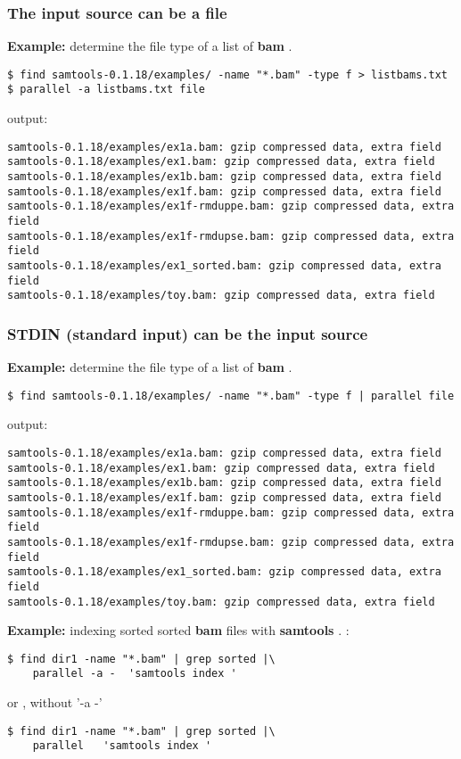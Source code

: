 \documentclass{article}
\newcommand{\example}[1]{
\textbf{Example: } {\color[rgb]{0,0,1} #1 } .
}
\def\bam{\textbf{bam}}
\def\samtools{\textbf{samtools}}
\begin{document}
\subsubsection{The input source can be a file}
\example{determine the file type of a list of \bam{}}
\begin{lstlisting}
$ find samtools-0.1.18/examples/ -name "*.bam" -type f > listbams.txt
$ parallel -a listbams.txt file
\end{lstlisting}
output:
\begin{lstlisting}
samtools-0.1.18/examples/ex1a.bam: gzip compressed data, extra field
samtools-0.1.18/examples/ex1.bam: gzip compressed data, extra field
samtools-0.1.18/examples/ex1b.bam: gzip compressed data, extra field
samtools-0.1.18/examples/ex1f.bam: gzip compressed data, extra field
samtools-0.1.18/examples/ex1f-rmduppe.bam: gzip compressed data, extra field
samtools-0.1.18/examples/ex1f-rmdupse.bam: gzip compressed data, extra field
samtools-0.1.18/examples/ex1_sorted.bam: gzip compressed data, extra field
samtools-0.1.18/examples/toy.bam: gzip compressed data, extra field
\end{lstlisting}




\subsubsection{STDIN (standard input) can be the input source}
\example{determine the file type of a list of \bam{}}
\begin{lstlisting}
$ find samtools-0.1.18/examples/ -name "*.bam" -type f | parallel file
\end{lstlisting}
output:
\begin{lstlisting}
samtools-0.1.18/examples/ex1a.bam: gzip compressed data, extra field
samtools-0.1.18/examples/ex1.bam: gzip compressed data, extra field
samtools-0.1.18/examples/ex1b.bam: gzip compressed data, extra field
samtools-0.1.18/examples/ex1f.bam: gzip compressed data, extra field
samtools-0.1.18/examples/ex1f-rmduppe.bam: gzip compressed data, extra field
samtools-0.1.18/examples/ex1f-rmdupse.bam: gzip compressed data, extra field
samtools-0.1.18/examples/ex1_sorted.bam: gzip compressed data, extra field
samtools-0.1.18/examples/toy.bam: gzip compressed data, extra field
\end{lstlisting}


\example{indexing sorted sorted \bam{} files with \samtools{}}:
\begin{lstlisting}
$ find dir1 -name "*.bam" | grep sorted |\
	parallel -a -  'samtools index '
\end{lstlisting}
or , without '-a -'
\begin{lstlisting}
$ find dir1 -name "*.bam" | grep sorted |\
	parallel   'samtools index '
\end{lstlisting}
\end{document}
